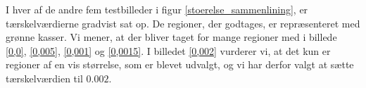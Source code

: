 {I hver af de andre fem testbilleder i figur \ref{stoerelse_sammenlining}, er
tærskelværdierne gradvist sat op. De regioner, der godtages, er repræsenteret med grønne kasser. 
Vi mener, at der bliver taget for mange regioner med i billede \ref{0,0}, \ref{0,005}, \ref{0,001} og
\ref{0,0015}. I billedet \ref{0,002} vurderer vi, at det kun er regioner
af en vis størrelse, som er blevet udvalgt, og vi har derfor
valgt at sætte tærskelværdien til $0.002$.

\begin{figure}[!h]
    \setlength\fboxsep{0pt}
    \setlength\fboxrule{0.5pt}
    \centering
    \\
\end{figure}}

